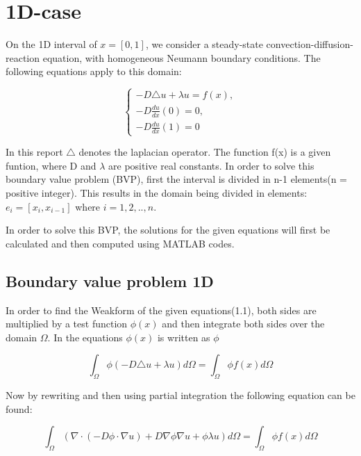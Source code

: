 \documentclass[a4paper]{report}
\begin{document}
\clearpage\mbox{}\clearpage

\tableofcontents


\chapter{1D-case}



On the 1D interval of $x = [0,1]  $, we consider a steady-state convection-diffusion-reaction equation, with homogeneous Neumann boundary conditions. The following equations apply to this domain:

\begin{equation}
\begin{cases} 
-D\triangle u + \lambda u = f(x),\\ -D\frac{du}{dx}(0) = 0 ,\\ -D\frac{du}{dx}(1) = 0
\end{cases} 
\end{equation}
\bigskip

In this report $\triangle$ denotes the laplacian operator. The function f(x) is a given funtion, where D and $\lambda$ are positive real constants. In order to solve this boundary value problem (BVP), first the interval is divided in n-1 elements(n = positive integer). This results in the domain being divided in elements: $e_i = [x_i, x_{i-1}]$ where $i={1,2,..,n}$. 

In order to solve this BVP, the solutions for the given equations will first be calculated and then computed using MATLAB codes.


\section{Boundary value problem 1D}
\vspace{5mm}

In order to find the Weakform of the given equations(1.1), both sides are multiplied by a test function  $\phi(x)$ and then integrate both sides over the domain $\Omega$. In the equations  $\phi(x)$ is written as $\phi$


\begin{equation}
	 \int_{\Omega} \phi(-D\triangle u + \lambda u )d\Omega = \int_{\Omega} \phi f(x) d\Omega 
\end{equation}	
\smallskip

Now by rewriting and then using partial integration the following equation can be found:


\begin{equation}
	\int_{\Omega} (\nabla\cdot(-D\phi\cdot\nabla u) + D\nabla\phi\nabla u +\phi \lambda u) d\Omega = \int_{\Omega} \phi f(x) d\Omega 
\end{equation}
\smallskip
\end{document}
